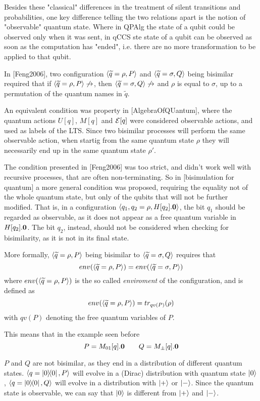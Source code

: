 Besides these "classical" differences in the treatment of silent transitions and probabilities, one key difference telling the two relations apart is the notion of "observable" quantum state. Where in QPAlg the state of a qubit could be observed only when it was sent, in qCCS ste state of a qubit can be observed as soon as the computation has "ended", i.e. there are no more transformation to be applied to that qubit.

In  [Feng2006], two configuration $\langle\widetilde{q} = \rho, P\rangle$ and $\langle\widetilde{q} = \sigma, Q\rangle$ being bisimilar required that if $\langle\widetilde{q} = \rho, P\rangle \not\rightarrow$, then $\langle\widetilde{q} = \sigma, Q\rangle \not\rightarrow$ and $\rho$ is equal to $\sigma$, up to a permutation of the quantum names in $\widetilde{q}$. 

An equivalent condition was property in [AlgebraOfQUantum], where the quantum actions $U[q]$, $M[q]$ and $\mathcal{E}[q]$ were considered observable actions, and used as labels of the LTS. Since two bisimilar processes will perform the same observable action, when startig from the same quantum state $\rho$ they will necessarily end up in the same quantum state $\rho'$.

The condition presented in [Feng2006] was too strict, and didn't work well with recursive processes, that are often non-terminating. So in [bisimulation for quantum] a more general condition was proposed, requiring the equality not of the whole quantum state, but only of the qubits that will not be further modified. That is, in a configuration $\langle q_1, q_2 = \rho, H[q_2].\mathbf{0}\rangle$, the bit $q_1$ should be regarded as observable, as it does not appear as a free quantum variable in $H[q_2].\mathbf{0}$. The bit $q_2$, instead, should not be considered when checking for bisimilarity, as it is not in its final state.

More formally, $\langle\widetilde{q} = \rho, P\rangle $ being bisimilar to $\langle\widetilde{q} = 	\sigma, Q\rangle$ requires that 
\[env(\langle\widetilde{q} = \rho, P\rangle) = env(\langle\widetilde{q} = \sigma, P\rangle)\]
where $env(\langle\widetilde{q} = \rho, P\rangle )$ is the so called \textit{enviroment} of the configuration, and is defined as \[env(\langle\widetilde{q} = \rho, P\rangle) = tr_{qv(P)}(\rho)\] with $qv(P)$ denoting the free quantum variables of $P$.

This means that in the example seen before
\[ P = M_{01}[q].\mathbf{0} \qquad Q = M_\pm[q].\mathbf{0}\]

$P$ and $Q$ are not bisimilar, as they end in a distribution of different quantum states. $\langle q = \ket{0}\!\!\bra{0}, P\rangle$ will evolve in a (Dirac) distribution with quantum state $\ket{0}$, $\langle q = \ket{0}\!\!\bra{0}, Q\rangle$ will evolve in a distribution with $\ket{+}$ or $\ket{-}$. Since the quantum state is observable, we can say that $\ket{0}$ is different from $\ket{+}$ and $\ket{-}$.

